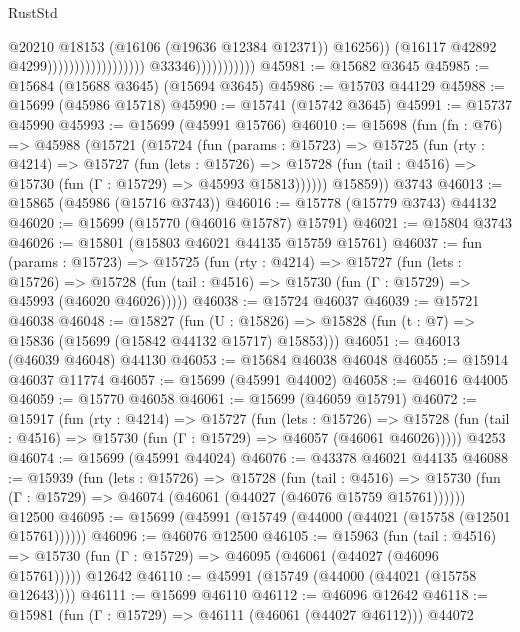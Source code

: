 \begin{lexlean}{RustStd}
\begin{coremodule}
                                                                @20210
                                                                @18153
                                                                (@16106 (@19636 @12384 @12371))
                                                                @16256))
                                                            (@16117 @42892 @4299))))))))))))))))))
                          @33346)))))))))))
@45981 := @15682 @3645
@45985 := @15684 (@15688 @3645) (@15694 @3645)
@45986 := @15703 @44129
@45988 := @15699 (@45986 @15718)
@45990 := @15741 (@15742 @3645)
@45991 := @15737 @45990
@45993 := @15699 (@45991 @15766)
@46010 := @15698
    (fun (fn : @76) =>
    @45988
      (@15721
        (@15724
          (fun (params : @15723) =>
          @15725
            (fun (rty : @4214) =>
            @15727
              (fun (lets : @15726) =>
              @15728 (fun (tail : @4516) => @15730 (fun (Γ : @15729) => @45993 @15813))))))
        @15859))
    @3743
@46013 := @15865 (@45986 (@15716 @3743))
@46016 := @15778 (@15779 @3743) @44132
@46020 := @15699 (@15770 (@46016 @15787) @15791)
@46021 := @15804 @3743
@46026 := @15801 (@15803 @46021 @44135 @15759 @15761)
@46037 := fun (params : @15723) =>
  @15725
    (fun (rty : @4214) =>
    @15727
      (fun (lets : @15726) =>
      @15728 (fun (tail : @4516) => @15730 (fun (Γ : @15729) => @45993 (@46020 @46026)))))
@46038 := @15724 @46037
@46039 := @15721 @46038
@46048 := @15827
    (fun (U : @15826) => @15828 (fun (t : @7) => @15836 (@15699 (@15842 @44132 @15717) @15853)))
@46051 := @46013 (@46039 @46048) @44130
@46053 := @15684 @46038 @46048
@46055 := @15914 @46037 @11774
@46057 := @15699 (@45991 @44002)
@46058 := @46016 @44005
@46059 := @15770 @46058
@46061 := @15699 (@46059 @15791)
@46072 := @15917
    (fun (rty : @4214) =>
    @15727
      (fun (lets : @15726) =>
      @15728 (fun (tail : @4516) => @15730 (fun (Γ : @15729) => @46057 (@46061 @46026)))))
    @4253
@46074 := @15699 (@45991 @44024)
@46076 := @43378 @46021 @44135
@46088 := @15939
    (fun (lets : @15726) =>
    @15728
      (fun (tail : @4516) =>
      @15730 (fun (Γ : @15729) => @46074 (@46061 (@44027 (@46076 @15759 @15761))))))
    @12500
@46095 := @15699 (@45991 (@15749 (@44000 (@44021 (@15758 (@12501 @15761))))))
@46096 := @46076 @12500
@46105 := @15963
    (fun (tail : @4516) => @15730 (fun (Γ : @15729) => @46095 (@46061 (@44027 (@46096 @15761)))))
    @12642
@46110 := @45991 (@15749 (@44000 (@44021 (@15758 @12643))))
@46111 := @15699 @46110
@46112 := @46096 @12642
@46118 := @15981 (fun (Γ : @15729) => @46111 (@46061 (@44027 @46112))) @44072

\end{coremodule}
\end{lexlean}
